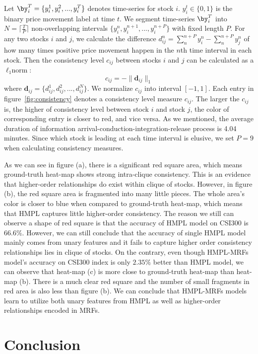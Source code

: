 \documentclass[sigconf]{acmart}
\begin{document}
Let $\by_i^T=\{y_i^1,y_i^2,...,y_i^T\}$ denotes time-series for
stock $i$. $y_i^t\in \{0,1\}$ is the binary price movement label
at time $t$. We segment time-series $\by_i^T$ into
$N=\lceil\frac{T}{P}\rceil$ non-overlapping intervals
$\{y_i^n,y_i^{n+1},...,y_i^{n+P}\}$ with fixed length $P$. For
any two stocks $i$ and $j$, we calculate the difference
$d_{ij}^n=\sum_n^{n+P}{y_i^n}-\sum_n^{n+P}{y_j^n}$ of how many
times positive price movement happen in the $n$th time interval
in each stock. Then the consistency level $c_{ij}$ between stocks
$i$ and $j$ can be calculated as a $\ell_1\text{norm}$:
$$c_{ij}=-\|\mathbf{d}_{ij}\|_1$$
\noindent where
$\mathbf{d}_{ij}=\{d_{ij}^1,d_{ij}^2,...,d_{ij}^N\}$. We
normalize $c_{ij}$ into interval $[-1,1]$. Each entry in
figure~\ref{fig:consistency} denotes a consistency level measure
$c_{ij}$. The larger the $c_{ij}$ is, the higher of consistency
level between stock $i$ and stock $j$, the color of corresponding
entry is closer to red, and vice versa. As we mentioned, the average duration of information
arrival-conduction-integration-release process is 4.04 minutes.
Since which stock is leading at each time interval is elusive, we
set $P=9$ when calculating consistency measures.

As we can see in figure (a), there is a significant red square
area, which means ground-truth heat-map shows strong intra-clique
consistency. This is an evidence that higher-order relationships
do exist within clique of stocks. However, in figure (b), the red
square area is fragmented into many little pieces. The whole
area's color is closer to blue when compared to ground-truth
heat-map, which means that HMPL captures little higher-order consistency.
The reason we still can observe a shape of red square
is that the accuracy of HMPL model on CSI300 is $66.6\%$.
However, we can still conclude that the accuracy of single HMPL
model mainly comes from unary features and it fails to capture
higher order consistency relationships lies in clique of stocks.
On the contrary, even though HMPL-MRFs model's accuracy on CSI300
index is only $2.35\%$ better than HMPL model, we can observe
that heat-map (c) is more close to ground-truth heat-map than
heat-map (b). There is a much clear red square and the number of
small fragments in red area is also less than figure (b). We can
conclude that HMPL-MRFs models learn to utilize both unary
features from HMPL as well as higher-order relationships encoded
in MRFs.

\section{Conclusion}
\label{sec:conc}
\end{document}

